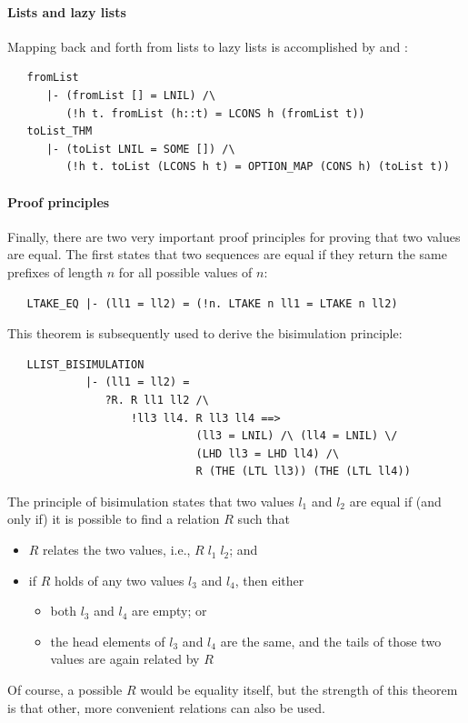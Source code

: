 {\paragraph{Lists and lazy lists}

Mapping back and forth from lists to lazy lists is accomplished
by  and :
\begin{hol}\begin{verbatim}
   fromList
      |- (fromList [] = LNIL) /\
         (!h t. fromList (h::t) = LCONS h (fromList t))
   toList_THM
      |- (toList LNIL = SOME []) /\
         (!h t. toList (LCONS h t) = OPTION_MAP (CONS h) (toList t))
\end{verbatim}\end{hol}

\paragraph{Proof principles}

Finally, there are two very important proof principles for proving
that two  values are equal.  The first states that two
sequences are equal if they return the same prefixes of length $n$ for
all possible values of $n$:
\begin{hol}
\begin{verbatim}
   LTAKE_EQ |- (ll1 = ll2) = (!n. LTAKE n ll1 = LTAKE n ll2)
\end{verbatim}
\end{hol}
This theorem is subsequently used to derive the bisimulation
principle:
\begin{hol}
\begin{verbatim}
   LLIST_BISIMULATION
            |- (ll1 = ll2) =
               ?R. R ll1 ll2 /\
                   !ll3 ll4. R ll3 ll4 ==>
                             (ll3 = LNIL) /\ (ll4 = LNIL) \/
                             (LHD ll3 = LHD ll4) /\
                             R (THE (LTL ll3)) (THE (LTL ll4))
\end{verbatim}
\end{hol}
The principle of bisimulation states that two  values $l_1$
and $l_2$ are equal if (and only if) it is possible to find a
relation $R$ such that
\begin{itemize}
\item $R$ relates the two values, i.e., $R\;l_1\;l_2$; and
\item if $R$ holds of any two values $l_3$ and $l_4$, then either
  \begin{itemize}
  \item both $l_3$ and $l_4$ are empty; or
  \item the head elements of $l_3$ and $l_4$ are the same, and the
    tails of those two values are again related by $R$
  \end{itemize}
\end{itemize}
Of course, a possible $R$ would be equality itself, but the strength
of this theorem is that other, more convenient relations can also be
used.

}
